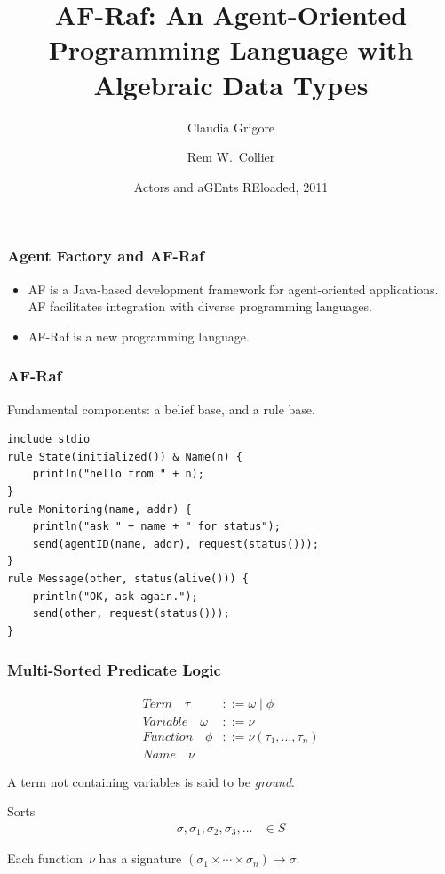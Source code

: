 \documentclass{beamer}
\title{AF-Raf: An Agent-Oriented Programming Language with Algebraic Data Types}
\author{Claudia Grigore \and Rem W.~Collier}
\institute{
  School of Computer Science\\
  University College Dublin\\
  IRCSET}
\date[AGERE~2011]{Actors and aGEnts REloaded, 2011}
\begin{document}
\begin{frame}
  \titlepage
\note[item]{}
\end{frame}

\begin{frame}
\frametitle{Agent Factory and AF-Raf}
\begin{itemize}
\item
  AF is a Java-based development framework for agent-oriented applications.
  AF facilitates integration with diverse programming languages.
\item
  AF-Raf is a new programming language.
\end{itemize}
\note[item]{}
\end{frame}

\begin{frame}[fragile]
\frametitle{AF-Raf}
Fundamental components: a belief base, and a rule base.
\medskip
\begin{Verbatim}
include stdio
rule State(initialized()) & Name(n) {
    println("hello from " + n);
}
rule Monitoring(name, addr) {
    println("ask " + name + " for status");
    send(agentID(name, addr), request(status()));
}
rule Message(other, status(alive())) {
    println("OK, ask again.");
    send(other, request(status()));
}
\end{Verbatim}

\end{frame}

\begin{frame}[fragile]
\frametitle{Multi-Sorted Predicate Logic}
\begin{align*}
\mathit{Term}\quad\tau &::= \omega \mid \phi \\
\mathit{Variable}\quad\omega &::= \nu \\
\mathit{Function}\quad\phi &::= \nu(\tau_1,\ldots,\tau_n) \\
\mathit{Name}\quad\nu
\end{align*}

A term not containing variables is said to be
\emph{ground}.

\begin{block}{Sorts}
\begin{align*}
\sigma, \sigma_1, \sigma_2, \sigma_3, \ldots &\in S
\end{align*}

Each function~$\nu$ has a signature
$(\sigma_1\times\cdots\times\sigma_n)\to\sigma$.  
\end{block}

\end{frame}
\end{document}

